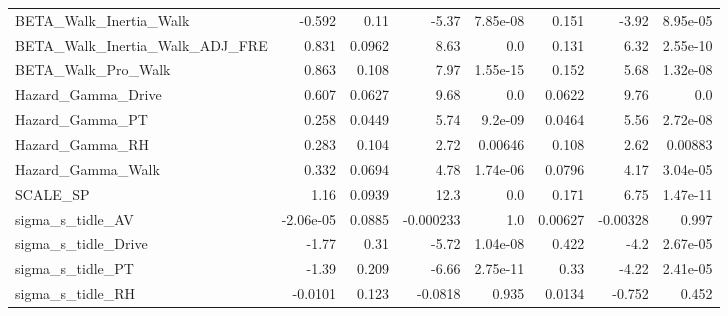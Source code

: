 \begin{tabular}{lrrrrrrr}
BETA\_Walk\_Inertia\_Walk           &    -0.592 &     0.11 &     -5.37 & 7.85e-08 &         0.151 &        -3.92 &      8.95e-05 \\
BETA\_Walk\_Inertia\_Walk\_ADJ\_FRE   &     0.831 &   0.0962 &      8.63 &      0.0 &         0.131 &         6.32 &      2.55e-10 \\
BETA\_Walk\_Pro\_Walk               &     0.863 &    0.108 &      7.97 & 1.55e-15 &         0.152 &         5.68 &      1.32e-08 \\
Hazard\_Gamma\_Drive               &     0.607 &   0.0627 &      9.68 &      0.0 &        0.0622 &         9.76 &           0.0 \\
Hazard\_Gamma\_PT                  &     0.258 &   0.0449 &      5.74 &  9.2e-09 &        0.0464 &         5.56 &      2.72e-08 \\
Hazard\_Gamma\_RH                  &     0.283 &    0.104 &      2.72 &  0.00646 &         0.108 &         2.62 &       0.00883 \\
Hazard\_Gamma\_Walk                &     0.332 &   0.0694 &      4.78 & 1.74e-06 &        0.0796 &         4.17 &      3.04e-05 \\
SCALE\_SP                         &      1.16 &   0.0939 &      12.3 &      0.0 &         0.171 &         6.75 &      1.47e-11 \\
sigma\_s\_tidle\_AV                 & -2.06e-05 &   0.0885 & -0.000233 &      1.0 &       0.00627 &     -0.00328 &         0.997 \\
sigma\_s\_tidle\_Drive              &     -1.77 &     0.31 &     -5.72 & 1.04e-08 &         0.422 &         -4.2 &      2.67e-05 \\
sigma\_s\_tidle\_PT                 &     -1.39 &    0.209 &     -6.66 & 2.75e-11 &          0.33 &        -4.22 &      2.41e-05 \\
sigma\_s\_tidle\_RH                 &   -0.0101 &    0.123 &   -0.0818 &    0.935 &        0.0134 &       -0.752 &         0.452 \\
\bottomrule
\end{tabular}

